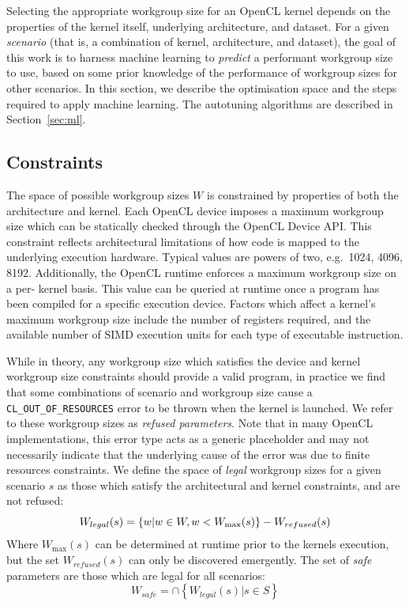 \documentclass[preprint,nonatbib,10pt,nocopyrightspace]{sigplanconf}
\begin{document}
Selecting the appropriate workgroup size for an OpenCL kernel depends on the
properties of the kernel itself, underlying architecture, and dataset. For a
given \emph{scenario} (that is, a combination of kernel, architecture, and
dataset), the goal of this work is to harness machine learning to \emph{predict}
a performant workgroup size to use, based on some prior knowledge of the
performance of workgroup sizes for other scenarios. In this section, we describe
the optimisation space and the steps required to apply machine learning. The
autotuning algorithms are described in Section~\ref{sec:ml}.

\subsection{Constraints}

The space of possible workgroup sizes $W$ is constrained by properties of both
the architecture and kernel. Each OpenCL device imposes a maximum workgroup size
which can be statically checked through the OpenCL Device API. This constraint
reflects architectural limitations of how code is mapped to the underlying
execution hardware. Typical values are powers of two, e.g.\ 1024, 4096, 8192.
Additionally, the OpenCL runtime enforces a maximum workgroup size on a per-
kernel basis. This value can be queried at runtime once a program has been
compiled for a specific execution device. Factors which affect a kernel's
maximum workgroup size include the number of registers required, and the
available number of SIMD execution units for each type of executable
instruction.

While in theory, any workgroup size which satisfies the device and kernel
workgroup size constraints should provide a valid program, in practice we find
that some combinations of scenario and workgroup size cause a
\texttt{CL\_OUT\_OF\_RESOURCES} error to be thrown when the kernel is launched.
We refer to these workgroup sizes as \emph{refused parameters}. Note that in
many OpenCL implementations, this error type acts as a generic placeholder and
may not necessarily indicate that the underlying cause of the error was due to
finite resources constraints. We define the space of \emph{legal} workgroup
sizes for a given scenario $s$ as those which satisfy the architectural and
kernel constraints, and are not refused:
%
\begin{equation}
  \footnotesize
  W_{legal}(s) = \left\{w | w \in W, w < W_{\max}(s) \right\} - W_{refused}(s)
\end{equation}
%
Where $W_{\max}(s)$ can be determined at runtime prior to the kernels execution,
but the set $W_{refused}(s)$ can only be discovered emergently. The set of
\emph{safe} parameters are those which are legal for all scenarios:
%
\begin{equation}
  W_{safe} = \cap \left\{ W_{legal}(s) | s \in S \right\}
\end{equation}
\end{document}
